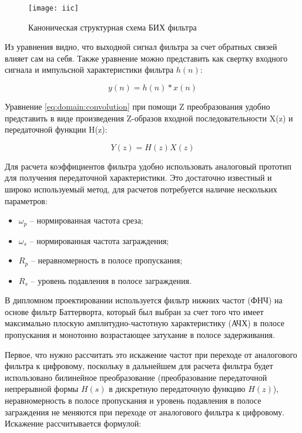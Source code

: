       \begin{figure}[ht]
        \centering
        \texttt{[image: iic]}
        \caption{Каноническая структурная схема БИХ фильтра}
        \label{pic:domain:iic}
    \end{figure}

Из уравнения видно, что выходной сигнал фильтра за счет обратных связей влияет сам на себя. 
Также уравнение можно представить как свертку входного сигнала и импульсной характеристики фильтра $h(n)$:

\begin{equation}
    \label{eq:domain:convolution}
    y(n) = h(n) \ast  x(n)
    \end{equation}

Уравнение \ref{eq:domain:convolution} при помощи Z преобразования удобно представить в виде произведения Z-образов входной последовательности X(z) и передаточной функции H(z):

\begin{equation}
    \label{eq:domain:Zconvolution}
    Y(z) = H(z)X(z)
    \end{equation}

Для расчета коэффициентов фильтра удобно использовать аналоговый прототип \cite{dsp} для получения передаточной характеристики. 
Это достаточно известный и широко используемый метод, для расчетов потребуется наличие нескольких параметров:

\begin{itemize}
    \item $\omega_{p}$  -- нормированная частота среза;
    \item $\omega_{s}$  -- нормированная частота заграждения;
    \item $R_{p}$  -- неравномерность в полосе пропускания;
    \item $R_{s}$  -- уровень подавления в полосе заграждения.
\end{itemize}

В дипломном проектировании используется фильтр нижних частот (ФНЧ) на основе фильтр Баттерворта, 
который был выбран за счет того что имеет максимально плоскую амплитудно-частотную характеристику
(АЧХ) в полосе пропускания и монотонно возрастающее затухание в полосе задерживания.

Первое, что нужно рассчитать это искажение частот при переходе от аналогового фильтра к цифровому, поскольку в дальнейшем для
расчета фильтра будет использовано билинейное преобразование (преобразование передаточной непрерывной формы $H(s)$ в дискретную передаточную функцию $H(z)$), 
неравномерность в полосе пропускания и уровень подавления в полосе 
заграждения не меняются при переходе от аналогового фильтра к цифровому. 
Искажение рассчитывается формулой:

